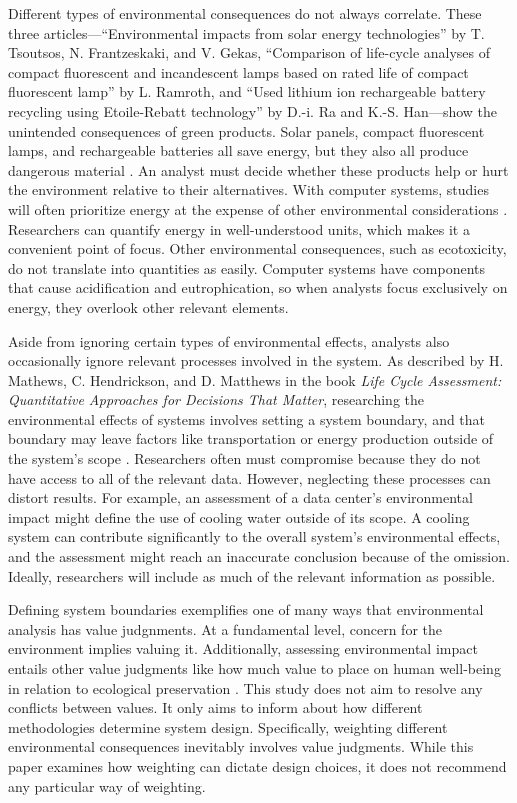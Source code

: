 \documentclass[final,journal,10pt,letterpaper,oneside,twocolumn,compsoc]%
{IEEEtran}
\begin{document}
Different types of environmental consequences do not always correlate. These
three articles---``Environmental impacts from solar energy
technologies'' by T. Tsoutsos, N. Frantzeskaki, and V. Gekas,
``Comparison of life-cycle analyses
of compact fluorescent and incandescent lamps based on rated life of compact
fluorescent lamp'' by L. Ramroth, and ``Used lithium
ion rechargeable battery recycling using Etoile-Rebatt technology'' by D.-i. Ra
and K.-S. Han---show the unintended consequences of green products. Solar
panels, compact fluorescent lamps, and rechargeable batteries all save energy,
but they also all produce dangerous material \cite{solar} \cite{cfl}
\cite{battery}. An analyst must decide whether these products help or hurt the
environment relative to their alternatives. With computer systems, studies
will
often prioritize energy at
the expense of other environmental considerations \cite{maga}. Researchers can
quantify energy in well-understood units, which makes it a convenient point of
focus. Other environmental consequences, such
as ecotoxicity, do not translate into quantities as easily. Computer systems
have components that cause acidification and eutrophication,
so when analysts focus exclusively on energy, they overlook other relevant
elements.

Aside from ignoring certain types of environmental effects, analysts also
occasionally ignore relevant processes involved in the system. As described by
H. Mathews, C. Hendrickson, and D. Matthews in the book \textit{Life Cycle
Assessment: Quantitative Approaches for Decisions That Matter}, researching the
environmental effects of systems involves setting a system boundary, and that
boundary may leave factors like transportation or energy production outside of
the system's scope \cite{textbook}. Researchers often must compromise because
they do not have access to all of the relevant data. However, neglecting
these processes can distort results. For example, an assessment of a data
center's environmental impact
might define the use of cooling water outside of its scope. A cooling system can
contribute significantly to the overall system's environmental effects, and the
assessment might reach an inaccurate conclusion because of the omission.
Ideally, researchers will include as much of the relevant information as
possible.

Defining system boundaries exemplifies one of many ways that environmental
analysis has value judgnments. At a fundamental level, concern for the
environment
implies valuing it. Additionally, assessing environmental impact entails other
value
judgments like how much value to place on human well-being in relation to
ecological preservation \cite{pre}. This study does not aim to resolve any
conflicts
between values. It only aims to inform about how different methodologies
determine
system design. Specifically, weighting different environmental consequences
inevitably involves value judgments. While this paper examines
how weighting can dictate design choices, it does not recommend any particular
way of weighting.
\end{document}

